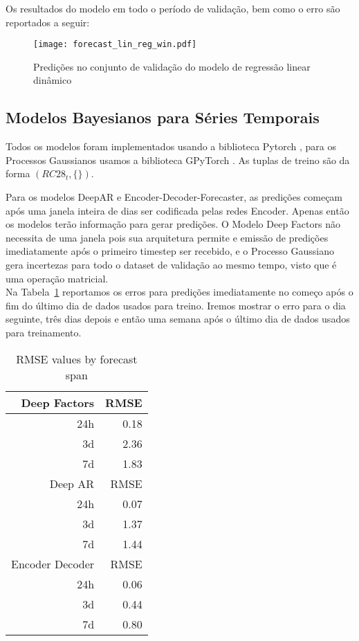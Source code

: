 Os resultados do modelo em todo o período de validação, bem como o erro são
reportados a seguir:

\begin{figure}[H]
  \centering
  \texttt{[image: forecast\_lin\_reg\_win.pdf]}
  \caption{Predições no conjunto de validação do modelo de regressão linear dinâmico}
  \label{fig:tdparam}
\end{figure}

\subsection{Modelos Bayesianos para Séries Temporais}


Todos os modelos foram implementados usando a biblioteca Pytorch \cite{pytorch}, para os Processos Gaussianos usamos a biblioteca GPyTorch \cite{gpytorch}. As tuplas de treino são da forma $(RC28_{t},\{\})$. 

Para os modelos DeepAR e Encoder-Decoder-Forecaster, as predições começam após uma janela inteira de dias ser codificada pelas redes Encoder. Apenas então os modelos terão informação para gerar predições. O Modelo Deep Factors não necessita de uma janela pois sua arquitetura permite e emissão de predições imediatamente após o primeiro timestep ser recebido, e o Processo Gaussiano gera incertezas para todo o dataset de validação ao mesmo tempo, visto que é uma operação matricial. \\

Na Tabela~\ref{tb:rmse} reportamos os erros para predições imediatamente no
começo após o fim do último dia de dados usados para treino. Iremos mostrar o
erro para o dia seguinte, três dias depois e então uma semana após o último dia
de dados usados para treinamento.

\begin{center}
\begin{table}[htbp]
\caption{RMSE values by forecast span}
\centering
\begin{tabular}{rr}
\hline
Deep Factors & RMSE\\
\hline
24h & 0.18\\
3d & 2.36\\
7d & 1.83\\
\hline
Deep AR & RMSE\\
\hline
24h & 0.07\\
3d & 1.37\\
7d & 1.44\\
\hline
Encoder Decoder & RMSE\\
\hline
24h & 0.06\\
3d & 0.44\\
7d & 0.80\\
\end{tabular}

\label{tb:rmse}
\end{table}
\end{center}


